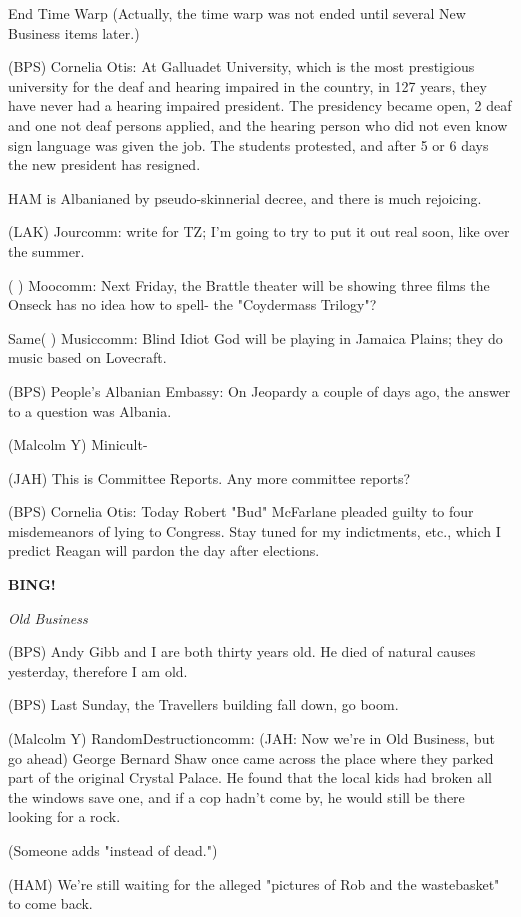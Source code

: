 \documentclass[12pt]{article}
\newcommand{\bing}{{\bf BING!} }
\newcommand{\goto}[1]{\bing \vskip 12pt \centerline{{\em{#1}}}}
\begin{document}
End Time Warp (Actually, the time warp was not ended until several New Business items later.)

(BPS) Cornelia Otis: At Galluadet University, which is the most prestigious university for the deaf and hearing impaired in the country, in 127 years, they have never had a hearing impaired president. The presidency became open, 2 deaf and one not deaf persons applied, and the hearing person who did not even know sign language was given the job. The students protested, and after 5 or 6 days the new president has resigned.

HAM is Albanianed by pseudo-skinnerial decree, and there is much rejoicing.

(LAK) Jourcomm: write for TZ; I'm going to try to put it out real soon, like over the summer.

( ) Moocomm: Next Friday, the Brattle theater will be showing three films the Onseck has no idea how to spell- the "Coydermass Trilogy"?

Same( ) Musiccomm: Blind Idiot God will be playing in Jamaica Plains; they do music based on Lovecraft.

(BPS) People's Albanian Embassy: On Jeopardy a couple of days ago, the answer to a question was Albania.

(Malcolm Y) Minicult-

(JAH) This is Committee Reports. Any more committee reports?

(BPS) Cornelia Otis: Today Robert "Bud" McFarlane pleaded guilty to four misdemeanors of lying to Congress. Stay tuned for my indictments, etc., which I predict Reagan will pardon the day after elections.

\goto{Old Business}

(BPS) Andy Gibb and I are both thirty years old. He died of natural causes yesterday, therefore I am old.

(BPS) Last Sunday, the Travellers building fall down, go boom.

(Malcolm Y) RandomDestructioncomm: (JAH: Now we're in Old Business, but go ahead) George Bernard Shaw once came across the place where they parked part of the original Crystal Palace. He found that the local kids had broken all the windows save one, and if a cop hadn't come by, he would still be there looking for a rock.

(Someone adds "instead of dead.")

(HAM) We're still waiting for the alleged "pictures of Rob and the wastebasket" to come back.
\end{document}
